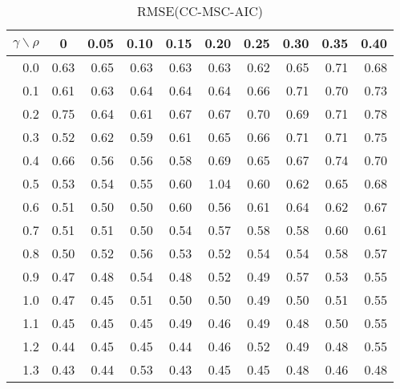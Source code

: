 \documentclass[12pt]{article}
\begin{document}
\begin{table}[!tbp]
\caption{RMSE(CC-MSC-AIC)}
 \begin{center}
 \begin{tabular}{r|rrrrrrrrr}\hline\hline
\multicolumn{1}{c|}{$\gamma\backslash\rho$}&\multicolumn{1}{c}{0}&\multicolumn{1}{c}{0.05}&\multicolumn{1}{c}{0.10}&\multicolumn{1}{c}{0.15}&\multicolumn{1}{c}{0.20}&\multicolumn{1}{c}{0.25}&\multicolumn{1}{c}{0.30}&\multicolumn{1}{c}{0.35}&\multicolumn{1}{c}{0.40}\tabularnewline
\hline


0.0&0.63&0.65&0.63&0.63&0.63&0.62&0.65&0.71&0.68\tabularnewline
0.1&0.61&0.63&0.64&0.64&0.64&0.66&0.71&0.70&0.73\tabularnewline
0.2&0.75&0.64&0.61&0.67&0.67&0.70&0.69&0.71&0.78\tabularnewline
0.3&0.52&0.62&0.59&0.61&0.65&0.66&0.71&0.71&0.75\tabularnewline
0.4&0.66&0.56&0.56&0.58&0.69&0.65&0.67&0.74&0.70\tabularnewline
0.5&0.53&0.54&0.55&0.60&1.04&0.60&0.62&0.65&0.68\tabularnewline
0.6&0.51&0.50&0.50&0.60&0.56&0.61&0.64&0.62&0.67\tabularnewline
0.7&0.51&0.51&0.50&0.54&0.57&0.58&0.58&0.60&0.61\tabularnewline
0.8&0.50&0.52&0.56&0.53&0.52&0.54&0.54&0.58&0.57\tabularnewline
0.9&0.47&0.48&0.54&0.48&0.52&0.49&0.57&0.53&0.55\tabularnewline
1.0&0.47&0.45&0.51&0.50&0.50&0.49&0.50&0.51&0.55\tabularnewline
1.1&0.45&0.45&0.45&0.49&0.46&0.49&0.48&0.50&0.55\tabularnewline
1.2&0.44&0.45&0.45&0.44&0.46&0.52&0.49&0.48&0.55\tabularnewline
1.3&0.43&0.44&0.53&0.43&0.45&0.45&0.48&0.46&0.48\tabularnewline
\hline
\end{tabular}

\end{center}

\end{table}

%
\end{document}
